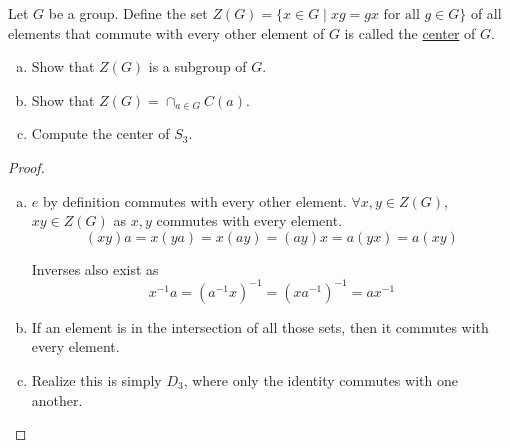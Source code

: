 Let $G$ be a group. Define the set $Z(G)=\{x\in G\mid xg=gx\text{ for all }g\in G\}$ of all elements that commute with every other element of $G$ is called the \ul{center} of $G$. 
\begin{enumerate}[(a)]
\item Show that $Z(G)$ is a subgroup of $G$. 
\item Show that $Z(G) = \cap_{a\in G}C(a)$. 
\item Compute the center of $S_3$. 
\end{enumerate}

\begin{proof}
\begin{enumerate}[(a)]
\item $e$ by definition commutes with every other element. $\forall x, y\in Z(G)$, $xy\in Z(G)$ as $x,y$ commutes with every element. 
\[(xy)a = x(ya) = x(ay) = (ay)x = a(yx) = a(xy)\]

Inverses also exist as
\[x^{-1}a = (a^{-1}x)^{-1} = (xa^{-1})^{-1} = ax^{-1}\]

\item If an element is in the intersection of all those sets, then it commutes with every element. 
\item Realize this is simply $D_3$, where only the identity commutes with one another. 
\end{enumerate}
	
\end{proof}


